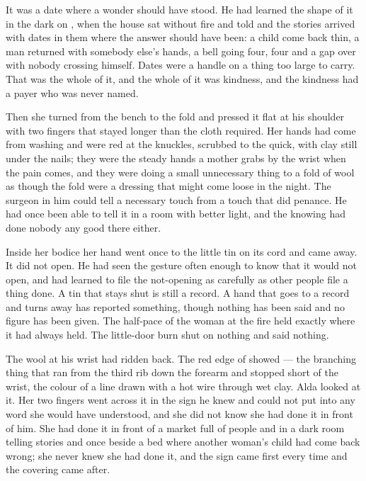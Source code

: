 It was a date where a wonder should have stood. He had learned the shape of it in the dark on , when the house sat without fire and told  and the stories arrived with dates in them where the answer should have been: a child come back thin, a man returned with somebody else's hands, a bell going four, four and a gap over  with nobody crossing himself. Dates were a handle on a thing too large to carry. That was the whole of it, and the whole of it was kindness, and the kindness had a payer who was never named.

Then she turned from the bench to the fold and pressed it flat at his shoulder with two fingers that stayed longer than the cloth required. Her hands had come from washing and were red at the knuckles, scrubbed to the quick, with clay still under the nails; they were the steady hands a mother grabs by the wrist when the pain comes, and they were doing a small unnecessary thing to a fold of wool as though the fold were a dressing that might come loose in the night. The surgeon in him could tell a necessary touch from a touch that did penance. He had once been able to tell it in a room with better light, and the knowing had done nobody any good there either.

Inside her bodice her hand went once to the little tin on its cord and came away. It did not open. He had seen the gesture often enough to know that it would not open, and had learned to file the not-opening as carefully as other people file a thing done. A tin that stays shut is still a record. A hand that goes to a record and turns away has reported something, though nothing has been said and no figure has been given. The half-pace of the woman at the fire held exactly where it had always held. The little-door burn shut on nothing and said nothing.

\scenebreak

The wool at his wrist had ridden back. The red edge of  showed --- the branching thing that ran from the third rib down the forearm and stopped short of the wrist, the colour of a line drawn with a hot wire through wet clay. Alda looked at it. Her two fingers went across it in the sign he knew and could not put into any word she would have understood, and she did not know she had done it in front of him. She had done it in front of a market full of people and in a dark room telling stories and once beside a bed where another woman's child had come back wrong; she never knew she had done it, and the sign came first every time and the covering came after.

